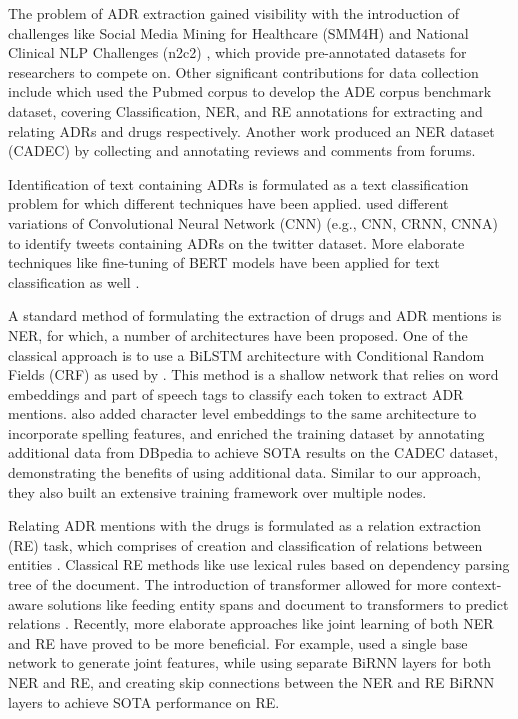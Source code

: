 \documentclass[letterpaper]{article}
\begin{document}
The problem of ADR extraction gained visibility with the introduction of challenges like Social Media Mining for Healthcare (SMM4H) \cite{ws-2019-social} and National Clinical NLP Challenges (n2c2) \cite{henry20202018}, which provide pre-annotated datasets for researchers to compete on. Other significant contributions for data collection include \cite{GURULINGAPPA2012885} which used the Pubmed corpus to develop the ADE corpus benchmark dataset, covering Classification, NER, and RE annotations for extracting and relating ADRs and drugs respectively. Another work \cite{article} produced an NER dataset (CADEC) by collecting and annotating reviews and comments from forums.

Identification of text containing ADRs is formulated as a text classification problem for which different techniques have been applied. \cite{huynh-etal-2016-adverse} used different variations of Convolutional Neural Network (CNN) (e.g., CNN, CRNN, CNNA) to identify tweets containing ADRs on the twitter dataset. More elaborate techniques like fine-tuning of BERT models have been applied for text classification as well \cite{kayastha-etal-2021-bert}.

A standard method of formulating the extraction of drugs and ADR mentions is NER, for which, a number of architectures have been proposed. One of the classical approach is to use a BiLSTM \cite{GRAVES2005602} architecture with Conditional Random Fields (CRF) as used by \cite{stanovsky-etal-2017-recognizing}. This method is a shallow network that relies on word embeddings and part of speech tags to classify each token to extract ADR mentions. \cite{DBLP:journals/corr/abs-2003-09288} also added character level embeddings to the same architecture to incorporate spelling features, and enriched the training dataset by annotating additional data from DBpedia to achieve SOTA results on the CADEC dataset, demonstrating the benefits of using additional data. Similar to our approach, they also built an extensive training framework over multiple nodes.

Relating ADR mentions with the drugs is formulated as a relation extraction (RE) task, which comprises of creation and classification of relations between entities \cite{haq2021deeper}. Classical RE methods like \cite{10.1093/bioinformatics/btl616} use lexical rules based on dependency parsing tree of the document. The introduction of transformer allowed for more context-aware solutions like feeding entity spans and document to transformers to predict relations \cite{DBLP:journals/corr/abs-1906-03158}. Recently, more elaborate approaches like joint learning of both NER and RE have proved to be more beneficial. For example, \cite{DBLP:journals/corr/abs-2002-06424} used a single base network to generate joint features, while using separate BiRNN layers for both NER and RE, and creating skip connections between the NER and RE BiRNN layers to achieve SOTA performance on RE.
\end{document}

